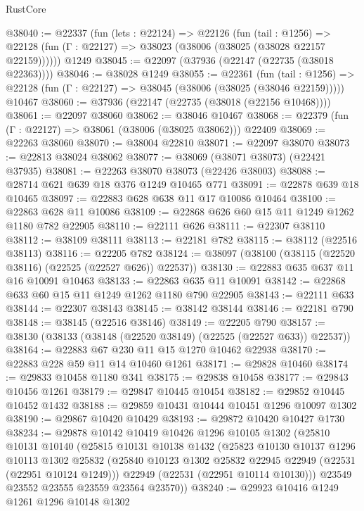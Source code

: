 \begin{lexlean}{RustCore}
\begin{coremodule}
@38040 := @22337
    (fun (lets : @22124) =>
    @22126
      (fun (tail : @1256) =>
      @22128 (fun (Γ : @22127) => @38023 (@38006 (@38025 (@38028 @22157 @22159))))))
    @1249
@38045 := @22097 (@37936 (@22147 (@22735 (@38018 @22363))))
@38046 := @38028 @1249
@38055 := @22361
    (fun (tail : @1256) => @22128 (fun (Γ : @22127) => @38045 (@38006 (@38025 (@38046 @22159)))))
    @10467
@38060 := @37936 (@22147 (@22735 (@38018 (@22156 @10468))))
@38061 := @22097 @38060
@38062 := @38046 @10467
@38068 := @22379 (fun (Γ : @22127) => @38061 (@38006 (@38025 @38062))) @22409
@38069 := @22263 @38060
@38070 := @38004 @22810
@38071 := @22097 @38070
@38073 := @22813 @38024 @38062
@38077 := @38069 (@38071 @38073) (@22421 @37935)
@38081 := @22263 @38070 @38073 (@22426 @38003)
@38088 := @28714 @621 @639 @18 @376 @1249 @10465 @771
@38091 := @22878 @639 @18 @10465
@38097 := @22883 @628 @638 @11 @17 @10086 @10464
@38100 := @22863 @628 @11 @10086
@38109 := @22868 @626 @60 @15 @11 @1249 @1262 @1180 @782 @22905
@38110 := @22111 @626
@38111 := @22307 @38110
@38112 := @38109 @38111
@38113 := @22181 @782
@38115 := @38112 (@22516 @38113)
@38116 := @22205 @782
@38124 := @38097 (@38100 (@38115 (@22520 @38116) (@22525 (@22527 @626)) @22537))
@38130 := @22883 @635 @637 @11 @16 @10091 @10463
@38133 := @22863 @635 @11 @10091
@38142 := @22868 @633 @60 @15 @11 @1249 @1262 @1180 @790 @22905
@38143 := @22111 @633
@38144 := @22307 @38143
@38145 := @38142 @38144
@38146 := @22181 @790
@38148 := @38145 (@22516 @38146)
@38149 := @22205 @790
@38157 := @38130 (@38133 (@38148 (@22520 @38149) (@22525 (@22527 @633)) @22537))
@38164 := @22883 @67 @230 @11 @15 @1270 @10462 @22938
@38170 := @22883 @228 @59 @11 @14 @10460 @1261
@38171 := @29828 @10460
@38174 := @29833 @10458 @1180 @341
@38175 := @29838 @10458
@38177 := @29843 @10456 @1261
@38179 := @29847 @10445 @10454
@38182 := @29852 @10445 @10452 @1432
@38188 := @29859 @10431 @10444 @10451 @1296 @10097 @1302
@38190 := @29867 @10420 @10429
@38193 := @29872 @10420 @10427 @1730
@38234 := @29878
    @10142
    @10419
    @10426
    @1296
    @10105
    @1302
    (@25810
      @10131
      @10140
      (@25815
        @10131
        @10138
        @1432
        (@25823
          @10130
          @10137
          @1296
          @10113
          @1302
          @25832
          (@25840 @10123 @1302 @25832 @22945 @22949 (@22531 (@22951 @10124 @1249)))
          @22949
          (@22531 (@22951 @10114 @10130)))
        @23549
        @23552
        @23555
        @23559
        @23564
        @23570))
@38240 := @29923 @10416 @1249 @1261 @1296 @10148 @1302

\end{coremodule}
\end{lexlean}
